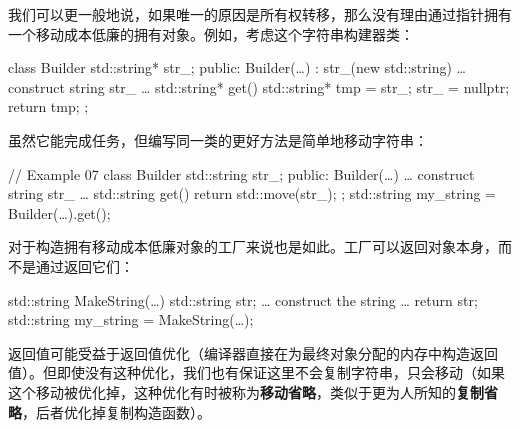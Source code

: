 我们可以更一般地说，如果唯一的原因是所有权转移，那么没有理由通过指针拥有一个移动成本低廉的拥有对象。例如，考虑这个字符串构建器类：

\begin{code}
class Builder {
  std::string* str_;
  public:
  Builder(…) : str_(new std::string){
    … construct string str_ …
  }
  std::string* get(){
    std::string* tmp = str_;
    str_ = nullptr;
    return tmp;
  }
};
\end{code}

虽然它能完成任务，但编写同一类的更好方法是简单地移动字符串：

\begin{code}
// Example 07
class Builder {
  std::string str_;
  public:
  Builder(…){ … construct string str_ … }
  std::string get(){ return std::move(str_); }
};
std::string my_string = Builder(…).get();
\end{code}

对于构造拥有移动成本低廉对象的工厂来说也是如此。工厂可以返回对象本身，而不是通过返回它们：

\begin{code}
std::string MakeString(…) {
  std::string str;
  … construct the string …
  return str;
}
std::string my_string = MakeString(…);
\end{code}

返回值可能受益于返回值优化（编译器直接在为最终对象分配的内存中构造返回值）。但即使没有这种优化，我们也有保证这里不会复制字符串，只会移动（如果这个移动被优化掉，这种优化有时被称为\textbf{移动省略}，类似于更为人所知的\textbf{复制省略}，后者优化掉复制构造函数）。

